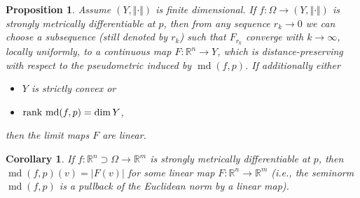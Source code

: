 \documentclass[12pt,leqno]{amsart}
\newtheorem{corollary}[theorem]{Corollary}
\newtheorem{proposition}[theorem]{Proposition}
\theoremstyle{definition}
\newcommand{\bbbr}{\mathbb R}
\def\rank{{\rm rank\,}}
\def\md{\operatorname{md}}
\numberwithin{theorem}{section} \numberwithin{equation}{section}
\begin{document}
\begin{proposition}
\label{lem:md l1.3}
Assume $(Y,\Vert\cdot\Vert)$ is finite dimensional. If $f:\Omega\to (Y,\Vert\cdot\Vert)$ is strongly metrically differentiable at $p$, then from any sequence $r_k\to 0$ we can choose a subsequence (still denoted by $r_k$) such that $F_{r_k}$ converge with $k\to\infty$, locally uniformly, to a continuous map $F:\bbbr^n\to Y$, which is distance-preserving with respect to the pseudometric induced by $\md(f,p)$. If additionally either
\begin{itemize}
        \item[a)] $Y$ is strictly convex or
        \item[b)] $\rank \md(f,p)=\dim Y$,
    \end{itemize}
then the limit maps $F$ are linear.
\end{proposition}
\begin{corollary}
If $f:\bbbr^n\supset\Omega\to\bbbr^m$ is strongly metrically differentiable at $p$, then $\md(f,p)(v)=|F(v)|$ for some linear map $F:\bbbr^n\to\bbbr^m$ (i.e., the seminorm $\md(f,p)$ is a pullback of the Euclidean norm by a linear map).
\end{corollary}
\end{document}
